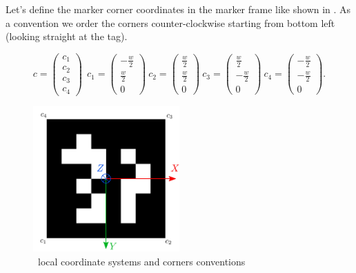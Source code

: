 Let's define the marker corner coordinates in the marker frame like shown in . As a convention 
\cite{wang2016iros} we order the corners counter-clockwise starting from bottom left (looking straight at the tag). 

\begin{equation}
    c =
    \begin{pmatrix}
    c_1 \\ c_2 \\ c_3 \\ c_4
    \end{pmatrix}
    ~~
    c_1 =  \begin{pmatrix} -\frac{w}{2} \\ \frac{w}{2} \\ 0 \end{pmatrix}
    ~ 
    c_2 =  \begin{pmatrix} \frac{w}{2} \\ \frac{w}{2} \\ 0 \end{pmatrix}
    ~
    c_3 =  \begin{pmatrix} \frac{w}{2} \\ -\frac{w}{2} \\ 0 \end{pmatrix}
    ~
    c_4 =  \begin{pmatrix} -\frac{w}{2} \\ -\frac{w}{2} \\ 0 \end{pmatrix}.
\end{equation}

%
\begin{figure}
    \centering
    \includegraphics[width=0.5\textwidth]{figures/tag12_frame.pdf}
    \caption{\apriltag~local coordinate systems and corners conventions \cite{wang2016iros}}
    \label{fig:tag_coordinate_frame}
\end{figure}

